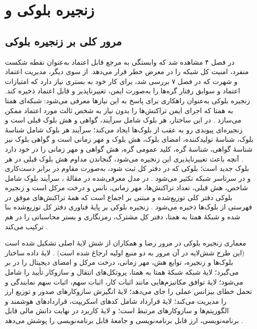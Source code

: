 \section{زنجیره بلوکی و }

\subsection{مرور کلی بر زنجیره بلوکی}

در فصل ۴ مشاهده شد که وابستگی به مرجع قابل اعتماد به‌عنوان نقطه شکست منفرد، امنیت کل شبکه را در معرض خطر قرار می‌دهد. از سوی دیگر، مدیریت اعتماد و شهرت که در فصل ۷ بررسی شد، برای کار خود به بستری نیاز دارد که امتیازات اعتماد و سوابق رفتار گره‌ها را به‌صورت ایمن، تغییرناپذیر و قابل اعتماد ذخیره کند. زنجیره بلوکی به‌عنوان راهکاری برای پاسخ به این نیازها معرفی می‌شود: شبکه‌ای همتا به همتا که اجرای ایمن تراکنش‌ها را بدون نیاز به شخص ثالث مورد اعتماد ممکن می‌سازد \cite{razaBlockchainBasedReputationTrust2024}. در این ساختار، هر بلوک شامل سرآیند، گواهی و هش بلوک قبلی است و زنجیره‌ای پیوندی رو به عقب از بلوک‌ها ایجاد می‌کند؛ سرآیند هر بلوک شامل شناسهٔ بلوک، شناسهٔ تولیدکننده، امضای بلوک، هش بلوک و مهر زمانی است و گواهی بلوک نیز شناسهٔ گواهی، شناسهٔ گره، کلید عمومی گره، هش گواهی و مهر زمانی را در خود دارد \cite{razaBlockchainBasedReputationTrust2024}. آنچه باعث تغییرناپذیری این زنجیره می‌شود، گنجاندن مداوم هش بلوک قبلی در هر بلوک جدید است؛ بلوکی که در دفتر کل ثبت شود، به‌صورت مقاوم در برابر دست‌کاری و در سرتاسر شبکه تکثیر می‌شود \cite{razaBlockchainBasedReputationTrust2024}. در مدل معرفی‌شده در مقالهٔ ، سرآیند بلوک شامل شاخص، هش قبلی، تعداد تراکنش‌ها، مهر زمانی، نانس و درخت مرکل است و زنجیره بلوکی دفتر کلی توزیع‌شده و مبتنی بر اجماع است که همهٔ تراکنش‌های موفق در فهرستی از بلوک‌ها ذخیره می‌شود \cite{ghovanlooyghajarSBTMSScalableBlockchain2021}. زنجیره بلوکی بر پایهٔ فناوری دفتر کل توزیع‌شده بنا شده و شبکهٔ همتا به همتا، دفتر کل مشترک، رمزنگاری و بستر محاسباتی را در هم ترکیب می‌کند \cite{razaBlockchainBasedReputationTrust2024}.

معماری زنجیره بلوکی در مرور رضا و همکاران از شش لایهٔ اصلی تشکیل شده است (این طرح شش‌لایه در آن مرور به دو منبع اولیه ارجاع شده است) \cite{razaBlockchainBasedReputationTrust2024}. لایهٔ داده ساختار بلوک‌ها و زنجیره، توابع هش، مهر زمانی، درخت مرکل و امضای دیجیتال را در بر می‌گیرد؛ لایهٔ شبکه شبکهٔ همتا به همتا، پروتکل‌های انتقال و سازوکار تأیید را شامل می‌شود؛ لایهٔ توافق مکانیزم‌هایی مانند اثبات کار، اثبات سهم، اثبات سهم نمایندگی و تحمل خطای بیزانس عملی را جای می‌دهد؛ لایهٔ انگیزش سازوکارهای صدور و توزیع ارز را مدیریت می‌کند؛ لایهٔ قرارداد شامل کدهای اسکریپت، قراردادهای هوشمند و الگوریتم‌ها و سازوکارهای مرتبط است؛ و لایهٔ کاربرد در نهایت دانش مالی قابل برنامه‌نویسی، ارز قابل برنامه‌نویسی و جامعهٔ قابل برنامه‌نویسی را پوشش می‌دهد \cite{razaBlockchainBasedReputationTrust2024}.


